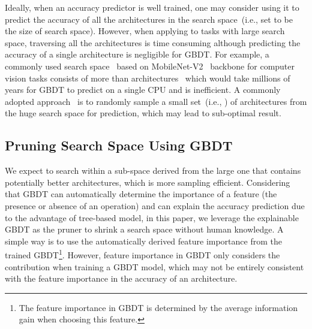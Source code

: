 \documentclass{article}
\begin{document}
Ideally, when an accuracy predictor is well trained, one may consider using it to predict the accuracy of all the architectures in the search space~(i.e., set  to be the size of search space). However, when applying to tasks with large search space, traversing all the architectures is time consuming although predicting the accuracy of a single architecture is negligible for GBDT. For example, a commonly used search space~\cite{proxylessnas,neuralpredictor} based on MobileNet-V2~\cite{mobilenetv2} backbone for computer vision tasks consists of more than  architectures~\cite{proxylessnas,mobilenetv3,onceforall} which would take millions of years for GBDT to predict on a single CPU and is inefficient. A commonly adopted approach~\cite{neuralpredictor,mctsnas} is to randomly sample a small set~(i.e., ) of architectures from the huge search space for prediction, which may lead to sub-optimal result.

\subsection{Pruning Search Space Using GBDT}
We expect to search within a sub-space derived from the large one that contains potentially better architectures, which is more sampling efficient. Considering that GBDT can automatically determine the importance of a feature (the presence or absence of an operation) and can explain the accuracy prediction due to the advantage of tree-based model, in this paper, we leverage the explainable GBDT as the pruner to shrink a search space without human knowledge. A simple way is to use the automatically derived feature importance from the trained GBDT\footnote{The feature importance in GBDT is determined by the average information gain when choosing this feature.}. However, feature importance in GBDT only considers the contribution when training a GBDT model, which may not be entirely consistent with the feature importance in the accuracy of an architecture.
\end{document}

